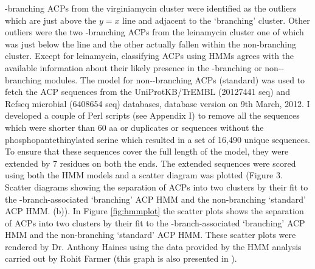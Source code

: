 	 \bet-branching ACPs from the virginiamycin cluster were identified as the outliers which are just above the $ y=x $ line and adjacent to the \textquoteleft branching\textquoteright{ } cluster. Other outliers were the two \bet-branching ACPs from the leinamycin cluster one of which was just below the line and the other actually fallen within the non-branching cluster. Except for leinamycin, classifying ACPs using HMMs agrees with the available information about their likely presence in the \bet-branching or non-\bet-branching modules. The model for non-\bet-branching ACPs (standard) was used to fetch the ACP sequences from the UniProtKB/TrEMBL (20127441 seq) and Refseq microbial (6408654 seq) databases, database version on 9th March, 2012. I developed a couple of Perl scripts (see Appendix I) to remove all the sequences which were shorter than 60 aa or duplicates or sequences without the phosphopantethinylated serine which resulted in a set of 16,490 unique sequences. To ensure that these sequences cover the full length of the model, they were extended by 7 residues on both the ends. The extended sequences were scored using both the HMM models and a scatter diagram was plotted (Figure 3. Scatter diagrams showing the separation of ACPs into two clusters by their fit to the \bet-branch-associated \textquoteleft branching\textquoteright{ } ACP HMM and the non-branching \textquoteleft standard\textquoteright{ } ACP HMM. (b)). In Figure  \ref{fig:hmmplot} the scatter plots shows the separation of ACPs into two clusters by their fit to the \bet-branch-associated \textquoteleft branching\textquoteright{ } ACP HMM and the non-branching \textquoteleft standard\textquoteright{ } ACP HMM. These scatter plots were rendered by Dr. Anthony Haines using the data provided by the HMM analysis carried out by Rohit Farmer (this graph is also presented in \parencite{Haines2013}). 

